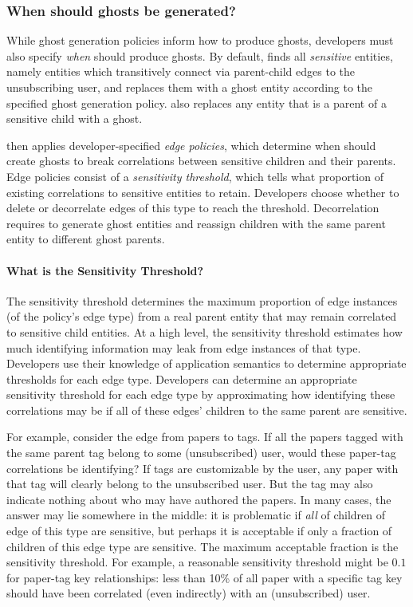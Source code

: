 \subsubsection{When should ghosts be generated?}
\label{design:edgepol}
While ghost generation policies inform \proto how to produce ghosts, developers must also specify
\emph{when} \proto should produce ghosts. 
By default, \proto finds all \emph{sensitive} entities,
namely entities which transitively connect via parent-child edges to the unsubscribing user, and
replaces them with a ghost entity according to the specified ghost generation policy. \proto also
replaces any entity that is a parent of a sensitive child with a ghost.

\proto then applies developer-specified \emph{edge policies}, which determine when \proto should
create ghosts to break correlations between sensitive children and their parents.
Edge policies consist of a \emph{sensitivity threshold}, which tells \proto what
proportion of existing correlations to sensitive entities to retain. Developers choose
whether to delete or decorrelate edges of this type to reach the threshold. Decorrelation requires
\proto to generate ghost entities and reassign children with the same parent entity to different
ghost parents.

\paragraph{What is the Sensitivity Threshold?}
%
The sensitivity threshold determines the maximum proportion of edge instances (of the policy's edge
type) from a real parent entity that may remain correlated to sensitive child entities.
At a high level, the sensitivity threshold estimates how much identifying information may leak from
edge instances of that type.  Developers use their knowledge of application semantics to determine
appropriate thresholds for each edge type.  Developers can determine an appropriate sensitivity
threshold for each edge type by approximating how identifying these correlations may be if
all of these edges' children to the same parent are sensitive.

For example, consider the edge from papers to tags. If all the papers tagged with the same parent
tag belong to some (unsubscribed) user, would these paper-tag correlations be identifying? If tags
are customizable by the user, any paper with that tag will clearly belong to the unsubscribed user.
But the tag may also indicate nothing about who may have authored the papers.  In many cases, the
answer may lie somewhere in the middle: it is problematic if \emph{all} of children of edge of this
type are sensitive, but perhaps it is acceptable if only a fraction of children of this edge type
are sensitive. The maximum acceptable fraction is the sensitivity threshold. For example, a
reasonable sensitivity threshold might be $0.1$ for paper-tag key relationships: less than 10\% of
all paper with a specific tag key should have been correlated (even indirectly) with an
(unsubscribed) user. 

